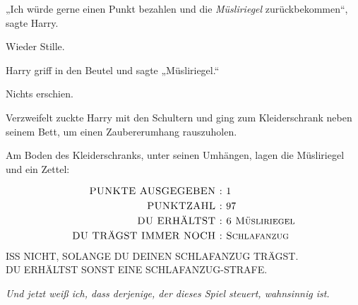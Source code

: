 „Ich würde gerne einen Punkt bezahlen und die \emph{Müsliriegel} zurückbekommen“, sagte Harry.

Wieder Stille.

Harry griff in den Beutel und sagte „Müsliriegel.“

Nichts erschien.

Verzweifelt zuckte Harry mit den Schultern und ging zum Kleiderschrank neben seinem Bett, um einen Zaubererumhang rauszuholen.

Am Boden des Kleiderschranks, unter seinen Umhängen, lagen die Müsliriegel und ein Zettel:
\begin{writtenNote}\centering
\begin{align*}
\hbox{\scshape \uppercase{Punkte ausgegeben}~: }&\hbox{1}\\
\hbox{\scshape \uppercase{Punktzahl}~: }&\hbox{97}\\
\hbox{\scshape \uppercase{Du erhältst}~: }&\hbox{\scshape 6 Müsliriegel}\\
\hbox{\scshape \uppercase{Du trägst immer noch}~: }&\hbox{\scshape Schlafanzug}\\
\end{align*}
\uppercase{Iss nicht, solange du deinen Schlafanzug trägst.}\\
\uppercase{Du erhältst sonst eine Schlafanzug-Strafe.}
\end{writtenNote}

\emph{Und jetzt weiß ich, dass derjenige, der dieses Spiel steuert, wahnsinnig ist.}

